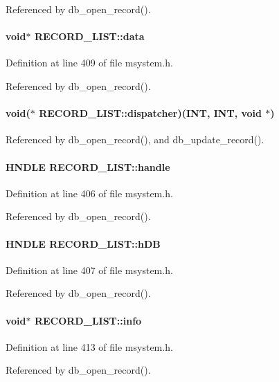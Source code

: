 Referenced by db\_\-open\_\-record().
\paragraph[{data}]{\setlength{\rightskip}{0pt plus 5cm}void$\ast$ {\bf RECORD\_\-LIST::data}}\hfill\label{structRECORD__LIST_a9a0cc4ee61489d2ac9acb241720f1743}


Definition at line 409 of file msystem.h.

Referenced by db\_\-open\_\-record().
\paragraph[{dispatcher}]{\setlength{\rightskip}{0pt plus 5cm}void($\ast$ {\bf RECORD\_\-LIST::dispatcher})({\bf INT}, {\bf INT}, void $\ast$)}\hfill\label{structRECORD__LIST_a15a60217a8c18c7157981f9ed48cbff0}


Referenced by db\_\-open\_\-record(), and db\_\-update\_\-record().
\paragraph[{handle}]{\setlength{\rightskip}{0pt plus 5cm}HNDLE {\bf RECORD\_\-LIST::handle}}\hfill\label{structRECORD__LIST_a8996d531d7c81872342634bc075825ef}


Definition at line 406 of file msystem.h.

Referenced by db\_\-open\_\-record().
\paragraph[{hDB}]{\setlength{\rightskip}{0pt plus 5cm}HNDLE {\bf RECORD\_\-LIST::hDB}}\hfill\label{structRECORD__LIST_ae6c9ff914d724aee6c073495517a9163}


Definition at line 407 of file msystem.h.

Referenced by db\_\-open\_\-record().
\paragraph[{info}]{\setlength{\rightskip}{0pt plus 5cm}void$\ast$ {\bf RECORD\_\-LIST::info}}\hfill\label{structRECORD__LIST_a51c46470aad6227f1a0bee691d0f70f4}


Definition at line 413 of file msystem.h.

Referenced by db\_\-open\_\-record().